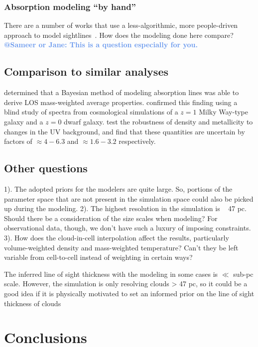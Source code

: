 \documentclass[fleqn,usenatbib]{mnras}
\makeatletter
\newcommand{\atsameer}[1]{\textcolor{CornflowerBlue}{\textbf{@Sameer or Jane: #1}}}
\makeatother
\begin{document}
\subsubsection{Absorption modeling ``by hand''}

There are a number of works that use a less-algorithmic, more people-driven approach to model sightlines~\citep[e.g.][]{Lacki2010}.
How does the modeling done here compare?
\atsameer{This is a question especially for you.}

\subsection{Comparison to similar analyses}

\cite{Liang2018} determined that a Bayesian method of modeling absorption lines was able to derive LOS mass-weighted average properties.
\cite{Marra2021} confirmed this finding using a blind study of spectra from cosmological simulations of a $z=1$ Milky Way-type galaxy and a $z=0$ dwarf galaxy.
\cite{Acharya2021} test the robustness of density and metallicity to changes in the UV background, and find that these quantities are uncertain by factors of $\approx 4-6.3$ and $\approx 1.6-3.2$ respectively.
\cite{Sameer2021} 

\subsection{Other questions}

1). The adopted priors for the modelers are quite large. So, portions of the parameter space that are not present in the simulation space could also be picked up during the modeling.
2). The highest resolution in the simulation is ~ 47 pc. Should there be a consideration of the size scales when modeling? For observational data, though, we don't have such a luxury of imposing constraints.
3). How does the cloud-in-cell interpolation affect the results, particularly volume-weighted density and mass-weighted temperature? Can't they be left variable from cell-to-cell instead of weighting in certain ways?

The inferred line of sight thickness with the modeling in some cases is $\ll$ sub-pc scale.
However, the simulation is only resolving clouds > 47 pc, so it could be a good idea if it is physically motivated to set an informed prior on the line of sight thickness of clouds

\section{Conclusions}
\label{s: conclusions}
\end{document}
